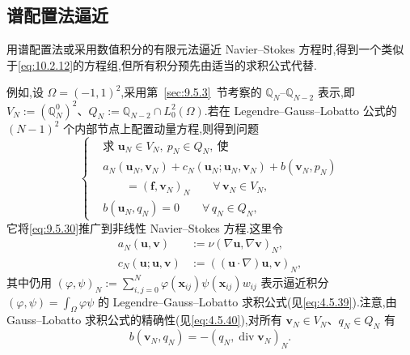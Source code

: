 \subsection{谱配置法逼近}\label{sec:10.2.3}

用谱配置法或采用数值积分的有限元法逼近 Navier--Stokes 方程时,得到一个类似于\eqref{eq:10.2.12}的方程组,但所有积分预先由适当的求积公式代替.

例如,设 \(\Omega=(-1,1)^2\),采用第~\ref{sec:9.5.3}~节考察的 \(\mathbb Q_N\)--\(\mathbb Q_{N-2}\) 表示,即 \(V_N:=(\mathbb Q_N^0)^2\)、\(Q_N:=\mathbb Q_{N-2}\cap L_0^2(\Omega)\).若在 Legendre--Gauss--Lobatto 公式的 \((N-1)^2\) 个内部节点上配置动量方程,则得到问题
\begin{equation}\label{eq:10.2.16}
  \left\{
  \begin{aligned}
    &\text{求 }\boldsymbol{u}_N\in V_N,\ p_N\in Q_N,\ \text{使}\\
    &a_N(\boldsymbol{u}_N,\boldsymbol{v}_N)+c_N(\boldsymbol{u}_N;\boldsymbol{u}_N,\boldsymbol{v}_N)
       +b(\boldsymbol{v}_N,p_N)\\
    &\qquad=(\boldsymbol{f},\boldsymbol{v}_N)_N
            \qquad\forall\,\boldsymbol{v}_N\in V_N,\\
    &b(\boldsymbol{u}_N,q_N)=0\qquad\forall\,q_N\in Q_N,
  \end{aligned}
  \right.
\end{equation}
它将\eqref{eq:9.5.30}推广到非线性 Navier--Stokes 方程.这里令
\[
  \begin{aligned}
    a_N(\boldsymbol{u},\boldsymbol{v})&:=\nu(\nabla\boldsymbol{u},\nabla\boldsymbol{v})_N,\\
    c_N(\boldsymbol{u};\boldsymbol{u},\boldsymbol{v})&:=((\boldsymbol{u}\cdot\nabla)\boldsymbol{u},\boldsymbol{v})_N,
  \end{aligned}
\]
其中仍用 \((\varphi,\psi)_N:=\sum_{i,j=0}^N\varphi(\boldsymbol{x}_{ij})\psi(\boldsymbol{x}_{ij})w_{ij}\) 表示逼近积分 \((\varphi,\psi)=\int_\Omega\varphi\psi\) 的 Legendre--Gauss--Lobatto 求积公式(见\eqref{eq:4.5.39}).注意,由 Gauss--Lobatto 求积公式的精确性(见\eqref{eq:4.5.40}),对所有 \(\boldsymbol{v}_N\in V_N\)、\(q_N\in Q_N\) 有
\[
  b(\boldsymbol{v}_N,q_N)=-(q_N,\operatorname{div}\boldsymbol{v}_N)_N.
\]

